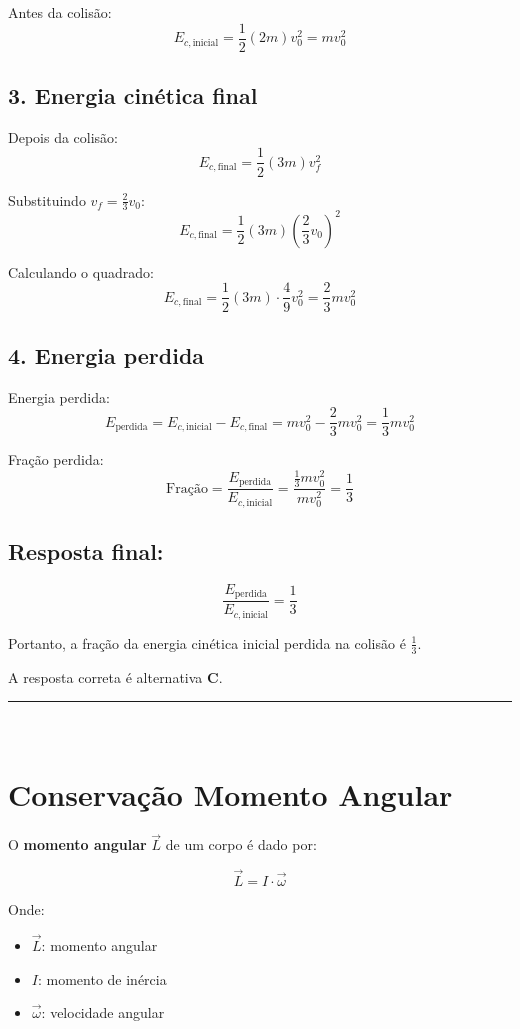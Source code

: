 \documentclass[a4paper,12pt]{article}
\begin{document}
\begin{flushleft}
Antes da colisão:
\[
E_{c,\text{inicial}} = \frac{1}{2} (2m) v_0^2 = m v_0^2
\]

\subsection*{3. Energia cinética final}

Depois da colisão:
\[
E_{c,\text{final}} = \frac{1}{2} (3m) v_f^2
\]

Substituindo \(v_f = \frac{2}{3}v_0\):
\[
E_{c,\text{final}} = \frac{1}{2} (3m) \left( \frac{2}{3} v_0 \right)^2
\]

Calculando o quadrado:
\[
E_{c,\text{final}} = \frac{1}{2} (3m) \cdot \frac{4}{9} v_0^2 = \frac{2}{3} m v_0^2
\]

\subsection*{4. Energia perdida}

Energia perdida:
\[
E_\text{perdida} = E_{c,\text{inicial}} - E_{c,\text{final}} = m v_0^2 - \frac{2}{3} m v_0^2 = \frac{1}{3} m v_0^2
\]

Fração perdida:
\[
\text{Fração} = \frac{E_\text{perdida}}{E_{c,\text{inicial}}} =
\frac{\frac{1}{3} m v_0^2}{m v_0^2} = \frac{1}{3}
\]

\subsection*{Resposta final:}

\[
\boxed{\frac{E_\text{perdida}}{E_{c,\text{inicial}}} = \frac{1}{3}}
\]

Portanto, a fração da energia cinética inicial perdida na colisão é \( \frac{1}{3} \).


A resposta correta é alternativa \colorbox{green!50}{\textbf{C}}.
\end{flushleft}

\noindent\rule{\linewidth}{0.6pt}\\

\section*{Conserva\c{c}\~ao Momento Angular}

O \textbf{momento angular} \( \vec{L} \) de um corpo é dado por:

\[
\vec{L} = I \cdot \vec{\omega}
\]

Onde:
\begin{itemize}
  \item \( \vec{L} \): momento angular
  \item \( I \): momento de inércia
  \item \( \vec{\omega} \): velocidade angular
\end{itemize}
\end{document}
